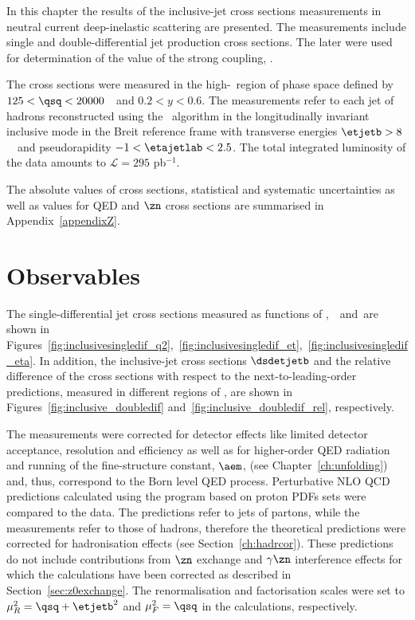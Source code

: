 In this chapter the results of the inclusive-jet cross sections measurements in neutral current deep-inelastic scattering are presented. The measurements include single and double-differential jet production cross sections. The later were used for determination of the value of the strong coupling, \asz. 

The cross sections were measured in the high-\qsq~region of phase space defined by $125 < \qsq < 20000$~\GeV~and $0.2<y<0.6$. The measurements refer to each jet of hadrons reconstructed using the \kt\, algorithm in the longitudinally invariant inclusive mode in the Breit reference frame with transverse energies $\etjetb > 8$~\GeV~and pseudorapidity $-1<\etajetlab<2.5$. The total integrated luminosity of the data amounts to $\mathcal{L}=295$ pb$^{-1}$.

The absolute values of cross sections, statistical and systematic uncertainties as well as values for QED and $\zn$ cross sections are summarised in Appendix~\ref{appendixZ}.

\section{Observables}
The single-differential jet cross sections measured as functions of \qsq,~\etjetb~and~\etajetlab are shown in Figures~\ref{fig:inclusivesingledif_q2},~\ref{fig:inclusivesingledif_et},~\ref{fig:inclusivesingledif_eta}. In addition, the inclusive-jet cross sections $\dsdetjetb$ and the relative difference of the cross sections with respect to the next-to-leading-order predictions, measured in different regions of \qsq, are shown in Figures~\ref{fig:inclusive_doubledif} and~\ref{fig:inclusive_doubledif_rel}, respectively.

The measurements were corrected for detector effects like limited detector acceptance, resolution and efficiency as well as for higher-order QED radiation and running of the fine-structure constant, $\aem$, (see Chapter~\ref{ch:unfolding}) and, thus, correspond to the Born level QED process. Perturbative NLO QCD predictions calculated using the \nlojet program based on  proton PDFs sets were compared to the data. The \nlojet predictions refer to jets of partons, while the measurements refer to those of hadrons, therefore the theoretical predictions were corrected for hadronisation effects (see Section~\ref{ch:hadrcor}). These predictions do not include contributions from $\zn$ exchange and $\gamma\zn$ interference effects for which the calculations have been corrected as described in Section~\ref{sec:z0exchange}. The renormalisation and factorisation scales were set to $\mu_R^2 = \qsq + \etjetb^2$ and $\mu_F^2 = \qsq$ in the calculations, respectively.

